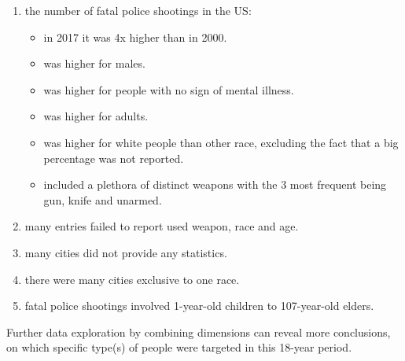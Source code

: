\documentclass[11pt, journal]{IEEEtran}
\begin{document}
\begin{enumerate}
	\item the number of fatal police shootings in the US:
		\begin{itemize}
 		 \item in 2017 it was 4x higher than in 2000.
 		 \item was higher for males.
 		 \item was higher for people with no sign of mental illness.
  		\item was higher for adults.  
		\item was higher for white people than other race, excluding the fact that a big percentage was not reported.
		\item included a plethora of distinct weapons with the 3 most frequent being gun, knife and unarmed.
		\end{itemize}
	\item many entries failed to report used weapon, race and age.
	\item many cities did not provide any statistics.
	\item there were many cities exclusive to one race.
	\item fatal police shootings involved 1-year-old children to 107-year-old elders.
\end{enumerate}

Further data exploration by combining dimensions can reveal more conclusions, on which specific type(s) of people were targeted in this 18-year period.



\end{document}
